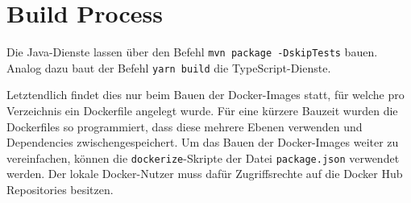 \section{Build Process}

Die Java-Dienste lassen über den Befehl \verb|mvn package -DskipTests| bauen.
Analog dazu baut der Befehl \verb|yarn build| die TypeScript-Dienste.

Letztendlich findet dies nur beim Bauen der Docker-Images statt, für welche pro Verzeichnis ein Dockerfile angelegt wurde.
Für eine kürzere Bauzeit wurden die Dockerfiles so programmiert, dass diese mehrere Ebenen verwenden und Dependencies zwischengespeichert.
Um das Bauen der Docker-Images weiter zu vereinfachen, können die \verb|dockerize|-Skripte der Datei \break \verb|package.json| verwendet werden.
Der lokale Docker-Nutzer muss dafür Zugriffsrechte auf die Docker Hub Repositories besitzen.
